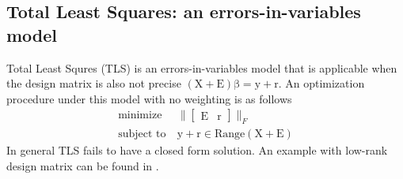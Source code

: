 \documentclass[10pt,a4paper]{article}
\newcommand{\boldvec}[1]{\boldsymbol{\mathrm{#1}}}
\let\vec\boldvec
\newcommand{\designMat}{\vec{X}} %
\newcommand{\observations}{\vec{y}} %
\newcommand{\param}{\vec{\beta}} %
\newcommand{\residual}{\vec{r}} %
\newcommand{\errorMat}{\vec{E}} %
\begin{document}
\subsection{Total Least Squares: an errors-in-variables model}

Total Least Squres (TLS) is an errors-in-variables model that is applicable when the design matrix is also not precise
$(\designMat + \errorMat)\param = \observations + \residual$. An optimization procedure under this model with no weighting is as follows
%
\begin{equation}
\begin{aligned}
\text{minimize} &\ \|\begin{bmatrix} \errorMat & \residual \end{bmatrix}\|_{F} \\
\text{subject to} &\ \observations + \residual \in \text{Range}(\designMat + \errorMat)
\end{aligned}
\end{equation}
%
In general TLS fails to have a closed form solution. An example with low-rank design matrix can be found in \cite{Golub80}. %

\end{document}
